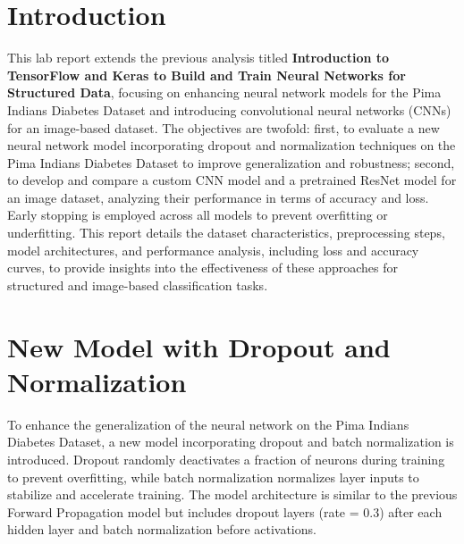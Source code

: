 \documentclass[a4paper,12pt]{article}
\begin{document}
\section*{Introduction}
This lab report extends the previous analysis titled \textbf{Introduction to TensorFlow and Keras to Build and Train Neural Networks for Structured Data}, focusing on enhancing neural network models for the Pima Indians Diabetes Dataset and introducing convolutional neural networks (CNNs) for an image-based dataset. The objectives are twofold: first, to evaluate a new neural network model incorporating dropout and normalization techniques on the Pima Indians Diabetes Dataset to improve generalization and robustness; second, to develop and compare a custom CNN model and a pretrained ResNet model for an image dataset, analyzing their performance in terms of accuracy and loss. Early stopping is employed across all models to prevent overfitting or underfitting. This report details the dataset characteristics, preprocessing steps, model architectures, and performance analysis, including loss and accuracy curves, to provide insights into the effectiveness of these approaches for structured and image-based classification tasks.

\section*{New Model with Dropout and Normalization}
To enhance the generalization of the neural network on the Pima Indians Diabetes Dataset, a new model incorporating dropout and batch normalization is introduced. Dropout randomly deactivates a fraction of neurons during training to prevent overfitting, while batch normalization normalizes layer inputs to stabilize and accelerate training. The model architecture is similar to the previous Forward Propagation model but includes dropout layers (rate = 0.3) after each hidden layer and batch normalization before activations.
\end{document}
